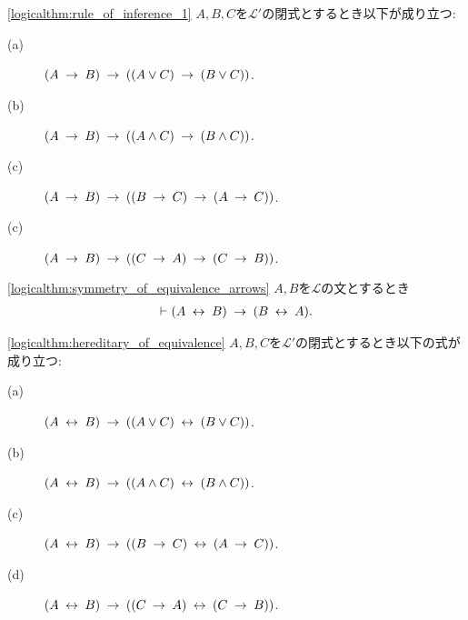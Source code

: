 	\begin{screen}
		\begin{logicalthm}[含意は遺伝する]
		\ref{logicalthm:rule_of_inference_1}
			$A,B,C$を$\mathcal{L}'$の閉式とするとき以下が成り立つ:
			\begin{description}
				\item[(a)] $(A \rarrow B) \rarrow ( (A \vee C) \rarrow (B \vee C) )$.
				
				\item[(b)] $(A \rarrow B) \rarrow ( (A \wedge C) \rarrow (B \wedge C) )$.
				
				\item[(c)] $(A \rarrow B) \rarrow ( (B \rarrow C) \rarrow (A \rarrow C) )$.
				
				\item[(c)] $(A \rarrow B) \rarrow ( (C \rarrow A) \rarrow (C \rarrow B) )$.
			\end{description}
		\end{logicalthm}
	\end{screen}
	
	\begin{screen}
		\begin{logicalthm}[同値記号の対称律]
		\ref{logicalthm:symmetry_of_equivalence_arrows}
			$A,B$を$\mathcal{L}$の文とするとき
			\begin{align}
				\vdash (A \lrarrow B) \rarrow (B \lrarrow A).
			\end{align}
		\end{logicalthm}
	\end{screen}
	
	\begin{screen}
		\begin{logicalthm}[同値記号の遺伝性質]
		\ref{logicalthm:hereditary_of_equivalence}
			$A,B,C$を$\mathcal{L}'$の閉式とするとき以下の式が成り立つ:
			\begin{description}
				\item[(a)] $(A \lrarrow B) \rarrow ((A \vee C) \lrarrow (B \vee C))$.
				\item[(b)] $(A \lrarrow B) \rarrow ((A \wedge C) \lrarrow (B \wedge C))$.
				\item[(c)] $(A \lrarrow B) \rarrow ((B \rarrow C) \lrarrow (A \rarrow C))$.
				
				\item[(d)] $(A \lrarrow B) \rarrow ((C \rarrow A) \lrarrow (C \rarrow B))$.
			\end{description}
		\end{logicalthm}
	\end{screen}
	
